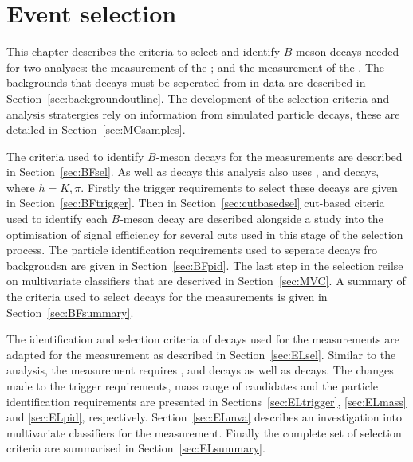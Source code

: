 \chapter{Event selection}
\label{selection_chapter}

This chapter describes the criteria to select and identify $B$-meson decays needed for two analyses: the measurement of the \bmumu \BFs; and the measurement of the \bsmumu \el. The backgrounds that \bmumu decays must be seperated from in data are described in Section~\ref{sec:backgroundoutline}. The development of the selection criteria and analysis stratergies rely on information from simulated particle decays, these are detailed in Section~\ref{sec:MCsamples}. 

The criteria used to identify $B$-meson decays for the \BF measurements are described in Section~\ref{sec:BFsel}. As well as \bmumu decays this analysis also uses \bukpsik, \bsjpsiphi and \bhh decays, where $h = K, \pi$. Firstly the trigger requirements to select these decays are given in Section~\ref{sec:BFtrigger}. Then in Section~\ref{sec:cutbasedsel} cut-based citeria used to identify each $B$-meson decay are described alongside a study into the optimisation of signal efficiency for several cuts used in this stage of the selection process. The particle identification requirements used to seperate \bmumu decays fro backgroudsn are given in Section~\ref{sec:BFpid}. The last step in the selection reilse on multivariate classifiers that are descrived in Section~\ref{sec:MVC}. A summary of the criteria used to select \bmumu decays for the \BF measurements is given in Section~\ref{sec:BFsummary}.

The identification and selection criteria of decays used for the \BF measurements are adapted for the \el measurement as described in Section~\ref{sec:ELsel}. Similar to the \BF analysis, the \el measurement requires \bsjpsiphi, \bdkpi and \bskk decays as well as \bsmumu decays. The changes made to the trigger requirements, mass range of \bsmumu candidates and the particle identification requirements are presented in Sections~\ref{sec:ELtrigger}, \ref{sec:ELmass} and \ref{sec:ELpid}, respectively. Section~\ref{sec:ELmva} describes an investigation into multivariate classifiers for the \el measurement. Finally the complete set of selection criteria are summarised in Section~\ref{sec:ELsummary}. 




